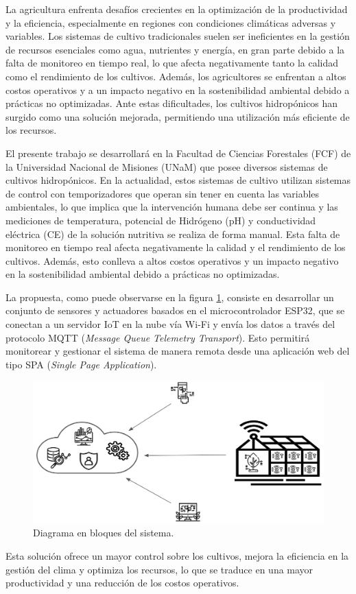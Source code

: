 La agricultura enfrenta desafíos crecientes en la optimización de la
productividad y la eficiencia, especialmente en regiones con condiciones
climáticas adversas y variables. Los sistemas de cultivo tradicionales suelen
ser ineficientes en la gestión de recursos esenciales como agua, nutrientes y
energía, en gran parte debido a la falta de monitoreo en tiempo real, lo que
afecta negativamente tanto la calidad como el rendimiento de los cultivos.
Además, los agricultores se enfrentan a altos costos operativos y a un impacto
negativo en la sostenibilidad ambiental debido a prácticas no optimizadas. Ante
estas dificultades, los cultivos hidropónicos han surgido como una solución
mejorada, permitiendo una utilización más eficiente de los recursos.

El presente trabajo se desarrollará en la Facultad de Ciencias Forestales (FCF) de la 
Universidad Nacional de Misiones (UNaM) que posee diversos sistemas de cultivos hidropónicos.
En la actualidad, estos sistemas de cultivo utilizan sistemas de control con temporizadores que 
operan sin tener en cuenta las variables ambientales, lo que implica que la intervención 
humana debe ser continua y las mediciones de temperatura, potencial de Hidrógeno (pH) y
conductividad eléctrica (CE) de la solución nutritiva se realiza de forma manual. Esta falta 
de monitoreo en tiempo real afecta negativamente la calidad y el rendimiento de los cultivos. 
Además, esto conlleva a altos costos operativos y un impacto negativo en la sostenibilidad  
ambiental debido a prácticas no optimizadas.

La propuesta, como puede observarse en la figura \ref{fig:diagBloques}, consiste
en desarrollar un conjunto de sensores y actuadores  basados en el microcontrolador ESP32, 
que se conectan a un servidor IoT en la nube vía Wi-Fi y envía los datos a través del protocolo MQTT 
(\textit{Message Queue Telemetry Transport}). Esto permitirá monitorear y gestionar el sistema 
de manera remota desde una aplicación web del tipo SPA (\textit{Single Page Application}).

\begin{figure}[htpb]
	\centering
	\includegraphics[width=.85\textwidth]{./Figuras/figura1.png}
	\caption{Diagrama en bloques del sistema.}
	\label{fig:diagBloques}
\end{figure}

Esta solución ofrece un mayor control sobre los cultivos, mejora la eficiencia en la gestión del clima y 
optimiza los recursos, lo que se traduce en una mayor productividad y una reducción de los costos operativos.